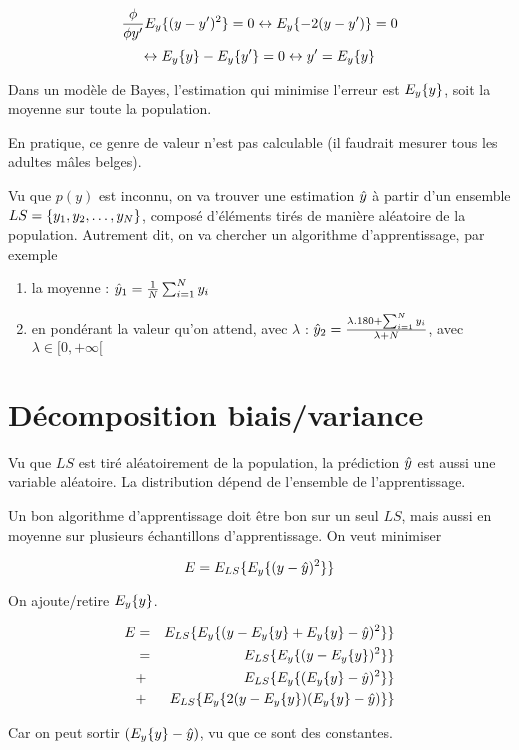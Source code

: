 	$$\frac{\phi}{\phi y'} E_y\{(y - y')^2\} = 0 \leftrightarrow E_y\{-2(y - y')\} = 0$$
	$$\leftrightarrow E_y\{y\} - E_y\{y'\} = 0 \leftrightarrow y' = E_y\{y\}$$
	
	Dans un modèle de Bayes, l'estimation qui minimise l'erreur est $E_y\{y\}$, soit la moyenne sur toute la population.
	
	En pratique, ce genre de valeur n'est pas calculable (il faudrait mesurer tous les adultes mâles belges).
	
	Vu que $p(y)$ est inconnu, on va trouver une estimation $\hat{y}$ à partir d'un ensemble $LS = \lbrace y_1, y_2, \dots , y_N \rbrace$, composé d'éléments tirés de manière aléatoire de la population. Autrement dit, on va chercher un algorithme d'apprentissage, par exemple
	
	\begin{enumerate}
		\item la moyenne : $\hat{y}_1 = \frac{1}{N} \sum_{i = 1}^N y_i$
		\item en pondérant la valeur qu'on attend, avec $\lambda$ : $\hat{y}_2 = \frac{\lambda . 180 + \sum_{i = 1}^N y_i}{\lambda + N}$, avec $\lambda \in [ 0, +\infty [ $
	\end{enumerate}
	
	\section{Décomposition biais/variance}
	
	Vu que $LS$ est tiré aléatoirement de la population, la prédiction $\hat{y}$ est aussi une variable aléatoire. La distribution dépend de l'ensemble de l'apprentissage.
	
	
	Un bon algorithme d'apprentissage doit être bon sur un seul $LS$, mais aussi en moyenne sur plusieurs échantillons d'apprentissage. On veut minimiser 
	
	$$E = E_{LS}\{E_y\{(y - \hat{y})^2\}\}$$
	
	On ajoute/retire $E_y\{y\}$.
	
	\begin{eqnarray*}
  	E & = & E_{LS}\{E_y\{(y - E_y\{y\} + E_y\{y\} - \hat{y})^2\}\} \\
  	 & = & E_{LS}\{E_y\{(y - E_y\{y\})^2\}\} \\
  	 & + & E_{LS}\{E_y\{(E_y\{y\} - \hat{y})^2\}\} \\
  	 & + & E_{LS}\{E_y\{2(y - E_y\{y\})(E_y\{y\} - \hat{y})\}\}
	\end{eqnarray*}

	Car on peut sortir $(E_y\{y\} - \hat{y})$, vu que ce sont des constantes.
	
